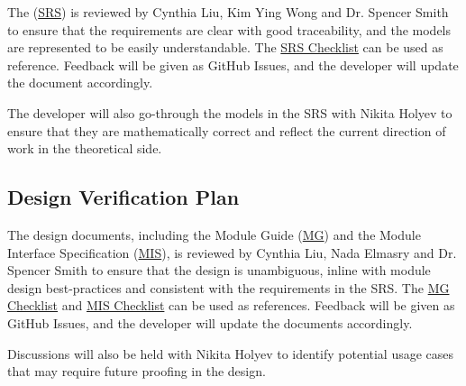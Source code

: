 \documentclass[12pt, titlepage]{article}
\begin{document}
The (\href{https://github.com/omltcat/turbulent-flow/blob/main/docs/SRS/SRS.pdf}{SRS}) is reviewed by Cynthia Liu, Kim Ying Wong and Dr. Spencer Smith to ensure that the requirements are clear with good traceability, and the models are represented to be easily understandable. The \href{https://github.com/omltcat/turbulent-flow/blob/main/docs/Checklists/SRS-Checklist.pdf}{SRS Checklist} can be used as reference. Feedback will be given as GitHub Issues, and the developer will update the document accordingly.

The developer will also go-through the models in the SRS with Nikita Holyev to ensure that they are mathematically correct and reflect the current direction of work in the theoretical side.



\subsection{Design Verification Plan}

The design documents, including the Module Guide (\href{https://github.com/omltcat/turbulent-flow/blob/main/docs/Design/SoftArchitecture/MG.pdf}{MG}) and the Module Interface Specification (\href{https://github.com/omltcat/turbulent-flow/blob/main/docs/Design/SoftDetailedDes/MIS.pdf}{MIS}), is reviewed by Cynthia Liu, Nada Elmasry and Dr. Spencer Smith to ensure that the design is unambiguous, inline with module design best-practices and consistent with the requirements in the SRS. The \href{https://github.com/omltcat/turbulent-flow/blob/main/docs/Checklists/MG-Checklist.pdf}{MG Checklist} and \href{https://github.com/omltcat/turbulent-flow/blob/main/docs/Checklists/MIS-Checklist.pdf}{MIS Checklist} can be used as references. Feedback will be given as GitHub Issues, and the developer will update the documents accordingly.

Discussions will also be held with Nikita Holyev to identify potential usage cases that may require future proofing in the design.



\end{document}
